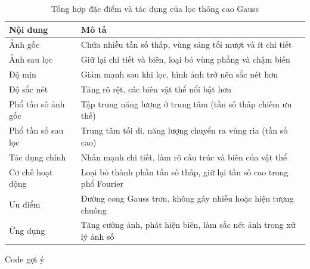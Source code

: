 \documentclass[12pt,a4paper]{report}
\numberwithin{equation}{section}
\theoremstyle{definition} %
\begin{document}
\begin{table}[H]
\centering
\caption{Tổng hợp đặc điểm và tác dụng của lọc thông cao Gauss}
\begin{tabular}{|p{4cm}|p{10cm}|}
\hline
\textbf{Nội dung} & \textbf{Mô tả} \\ \hline
Ảnh gốc & Chứa nhiều tần số thấp, vùng sáng tối mượt và ít chi tiết \\ \hline
Ảnh sau lọc & Giữ lại chi tiết và biên, loại bỏ vùng phẳng và chậm biến \\ \hline
Độ mịn & Giảm mạnh sau khi lọc, hình ảnh trở nên sắc nét hơn \\ \hline
Độ sắc nét & Tăng rõ rệt, các biên vật thể nổi bật hơn \\ \hline
Phổ tần số ảnh gốc & Tập trung năng lượng ở trung tâm (tần số thấp chiếm ưu thế) \\ \hline
Phổ tần số sau lọc & Trung tâm tối đi, năng lượng chuyển ra vùng rìa (tần số cao) \\ \hline
Tác dụng chính & Nhấn mạnh chi tiết, làm rõ cấu trúc và biên của vật thể \\ \hline
Cơ chế hoạt động & Loại bỏ thành phần tần số thấp, giữ lại tần số cao trong phổ Fourier \\ \hline
Ưu điểm & Đường cong Gauss trơn, không gây nhiễu hoặc hiện tượng chuông \\ \hline
Ứng dụng & Tăng cường ảnh, phát hiện biên, làm sắc nét ảnh trong xử lý ảnh số \\ \hline
\end{tabular}
\end{table}

Code gợi ý
\end{document}
